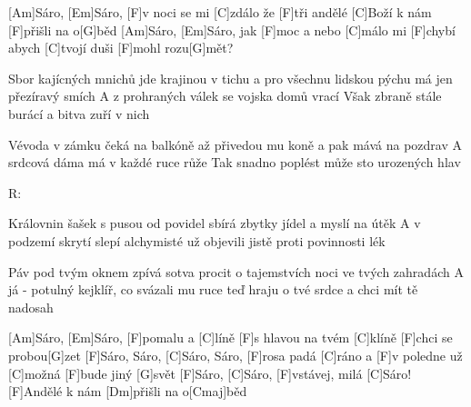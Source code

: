 
[Am]Sáro, [Em]Sáro, [F]v noci se mi [C]zdálo 
že [F]tři andělé [C]Boží k nám [F]přišli na o[G]běd 
[Am]Sáro, [Em]Sáro, jak [F]moc a nebo [C]málo 
mi [F]chybí abych [C]tvojí duši [F]mohl rozu[G]mět? 

Sbor kajícných mnichů jde krajinou v tichu 
a pro všechnu lidskou pýchu 
má jen přezíravý smích 
A z prohraných válek se vojska domů vrací 
Však zbraně stále burácí 
a bitva zuří v nich 

Vévoda v zámku čeká na balkóně 
až přivedou mu koně 
a pak mává na pozdrav 
A srdcová dáma má v každé ruce růže 
Tak snadno poplést může 
sto urozených hlav 

R:

Královnin šašek s pusou od povidel 
sbírá zbytky jídel 
a myslí na útěk 
A v podzemí skrytí slepí alchymisté 
už objevili jistě 
proti povinnosti lék 

Páv pod tvým oknem zpívá sotva procit 
o tajemstvích noci 
ve tvých zahradách 
A já - potulný kejklíř, co svázali mu ruce 
teď hraju o tvé srdce 
a chci mít tě nadosah 

[Am]Sáro, [Em]Sáro, [F]pomalu a [C]líně 
[F]s hlavou na tvém [C]klíně [F]chci se probou[G]zet 
[F]Sáro, Sáro, [C]Sáro, Sáro, [F]rosa padá [C]ráno 
a [F]v poledne už [C]možná [F]bude jiný [G]svět 
[F]Sáro, [C]Sáro, [F]vstávej, milá [C]Sáro! 
[F]Andělé k nám [Dm]přišli na o[Cmaj]běd
